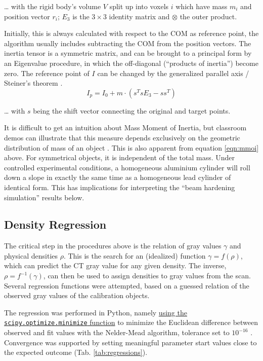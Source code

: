 \ldots{} with the rigid body's volume \(V\) split up into voxels \(i\) which have mass \(m_i\) and position vector \(r_{i}\); \(E_{3}\) is the \(3\times 3\) identity matrix and \(\otimes\) the outer product.

Initially, this is always calculated with respect to the COM as reference point, the algorithm usually includes subtracting the COM from the position vectors.
The inertia tensor is a symmetric matrix, and can be brought to a principal form by an Eigenvalue procedure, in which the off-diagonal (``products of inertia'') become zero.
The reference point of \(I\) can be changed by the generalized parallel axis / Steiner's theorem \citep[][p. 245]{Lynch2017}.
\begin{equation}\label{eqn:steiner}
 I_{p} = I_{0} + m \cdot \left( s^{T} s E_{3} - s s^{T} \right)
\end{equation}

\ldots{} with \(s\) being the shift vector connecting the original and target points.


It is difficult to get an intuition about Mass Moment of Inertia, but classroom demos can illustrate that this measure depends exclusively on the geometric distribution of mass of an object \citep{Lewin801L19,LewinMOI}.
This is also apparent from equation \eqref{eqn:mmoi} above.
For symmetrical objects, it is independent of the total mass.
Under controlled experimental conditions, a homogeneous aluminium cylinder will roll down a slope in exactly the same time as a homogeneous lead cylinder of identical form.
This has implications for interpreting the ``beam hardening simulation'' results below.


\subsection{Density Regression}
\label{sec:orgd180e8f}
The critical step in the procedures above is the relation of gray values \(\gamma\) and physical densities \(\rho\).
This is the search for an (idealized) function \(\gamma = f(\rho )\), which can predict the CT gray value for any given density.
The inverse, \(\rho = f^{-1}(\gamma )\), can then be used to assign densities to gray values from the scan.
Several regression functions were attempted, based on a guessed relation of the observed gray values of the calibration objects.

The regression was performed in Python, namely \href{https://docs.scipy.org/doc/scipy/reference/generated/scipy.optimize.minimize.html}{using the \texttt{scipy.optimize.minimize} function} to minimize the Euclidean difference between observed and fit values with the Nelder-Mead algorithm, tolerance set to \(10^{-16}\) \citep{Gao2012}.
Convergence was supported by setting meaningful parameter start values close to the expected outcome (Tab. \ref{tab:regressions}).

